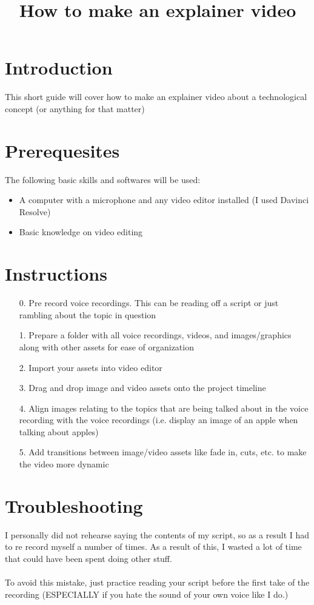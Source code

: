\documentclass[12pt]{article}
\title{How to make an explainer video}
\date{}
\begin{document}
\maketitle

\section*{Introduction}
This short guide will cover how to make an explainer video about a technological concept (or anything for that matter)

\section*{Prerequesites}
The following basic skills and softwares will be used:
\begin{itemize}
    \item A computer with a microphone and any video editor installed (I used Davinci Resolve)
    \item Basic knowledge on video editing
\end{itemize}

\section*{Instructions}
\begin{itemize}
    \item[0.] Pre record voice recordings. This can be reading off a script or just rambling about the topic in question
    \item[1.] Prepare a folder with all voice recordings, videos, and images/graphics along with other assets for ease of organization
    \item[2.] Import your assets into video editor
    \item[3.] Drag and drop image and video assets onto the project timeline
    \item[4.] Align images relating to the topics that are being talked about in the voice recording with the voice recordings (i.e. display an image of an apple when talking about apples)
    \item[5.] Add transitions between image/video assets like fade in, cuts, etc. to make the video more dynamic
\end{itemize}

\section*{Troubleshooting}
I personally did not rehearse saying the contents of my script, so as a result I had to re record myself a number of times. As a result of this, I wasted a lot of time that could have been spent doing other stuff.\\ \\To avoid this mistake, just practice reading your script before the first take of the recording (ESPECIALLY if you hate the sound of your own voice like I do.)
\end{document}

